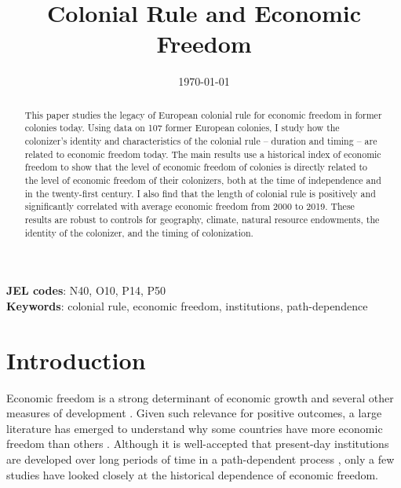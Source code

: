 \documentclass[a4paper,12pt]{article}
\title{Colonial Rule and Economic Freedom
       \bigskip}
\date{\today}
\begin{document}

\maketitle

\begin{abstract}
\noindent This paper studies the legacy of European colonial rule for economic freedom in former colonies today. Using data on 107 former European colonies, I study how the colonizer's identity and characteristics of the colonial rule -- duration and timing -- are related to economic freedom today. The main results use a historical index of economic freedom to show that the level of economic freedom of colonies is directly related to the level of economic freedom of their colonizers, both at the time of independence and in the twenty-first century. I also find that the length of colonial rule is positively and significantly correlated with average economic freedom from 2000 to 2019. These results are robust to controls for geography, climate, natural resource endowments, the identity of the colonizer, and the timing of colonization.

\end{abstract}

\bigskip \bigskip
\begin{footnotesize}
\noindent \textbf{JEL codes}: N40, O10, P14, P50 \\
\noindent \textbf{Keywords}: colonial rule, economic freedom, institutions, path-dependence
\end{footnotesize}

\clearpage
\doublespacing

\section{Introduction} 
    \label{sec:Intro}

Economic freedom is a strong determinant of economic growth and several other measures of development \citep{dehaan2006market,Hall2014,LawsonMiozziTuszynski2024}. Given such relevance for positive outcomes, a large literature has emerged to understand why some countries have more economic freedom than others \citep{lawson2020determinants}. Although it is well-accepted that present-day institutions are developed over long periods of time in a path-dependent process \citep{North1991,spolaore2013deep}, only a few studies have looked closely at the historical dependence of economic freedom. 
\end{document}
